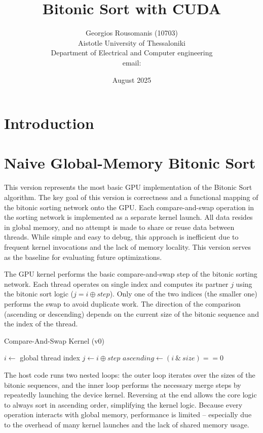 \documentclass{article}
\title{Bitonic Sort with CUDA}
\author{Georgios Rousomanis (10703) \\ 
Aistotle University of Thessaloniki \\ 
Department of Electrical and Computer engineering \\
email: }
\date{August 2025}
\begin{document}
\maketitle

\section*{Introduction}

\section{Naive Global-Memory Bitonic Sort}

This version represents the most basic GPU implementation of the Bitonic Sort algorithm. The key goal of this 
version is correctness and a functional mapping of the bitonic sorting network onto the GPU. Each 
compare-and-swap operation in the sorting network is implemented as a separate kernel launch. All data resides 
in global memory, and no attempt is made to share or reuse data between threads. While simple and easy to debug, 
this approach is inefficient due to frequent kernel invocations and the lack of memory locality. This version 
serves as the baseline for evaluating future optimizations.

The GPU kernel performs the basic compare-and-swap step of the bitonic sorting network. Each thread operates on 
single index and computes its partner $j$ using the bitonic sort logic ($j = i \oplus step$). Only one of the two 
indices (the smaller one) performs the swap to avoid duplicate work. The direction of the comparison (ascending or
descending) depends on the current size of the bitonic sequence and the index of the thread.

\begin{algorithm}[H]
\caption{Compare-And-Swap Kernel (v0)}
\begin{algorithmic}[1]
    \State $i \gets$ global thread index
     \Return \EndIf
    \State $j \gets i \oplus step$
        \State $ascending \gets (i \ \&\ size) == 0$
        \State {}
    \EndIf
\EndProcedure
\end{algorithmic}
\end{algorithm}

The host code runs two nested loops: the outer loop iterates over the sizes of the bitonic sequences, and the 
inner loop performs the necessary merge steps by repeatedly launching the device kernel. Reversing at the end 
allows the core logic to always sort in ascending order, simplifying the kernel logic. Because every operation 
interacts with global memory, performance is limited -- especially due to the overhead of many kernel launches 
and the lack of shared memory usage.
\end{document}
